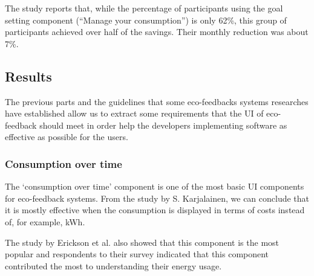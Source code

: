 \documentclass[journal]{vgtc}                %
\begin{document}
The study reports that, while the percentage of participants using the goal setting component (``Manage your consumption'') is only 62\%, this group of participants achieved over half of the savings. Their monthly reduction was about 7\%.

\subsection{Results}
The previous parts and the guidelines that some eco-feedbacks systems researches have established allow us to extract some requirements that the UI of eco-feedback should meet in order help the developers implementing software as effective as possible for the users. \\ %

%

\subsubsection{Consumption over time}
The `consumption over time' component is one of the most basic UI components for eco-feedback systems. From the study by S. Karjalainen, we can conclude that it is mostly effective when the consumption is displayed in terms of costs instead of, for example, kWh.

The study by Erickson et al. also showed that this component is the most popular and respondents to their survey indicated that this component contributed the most to understanding their energy usage.
\end{document}
